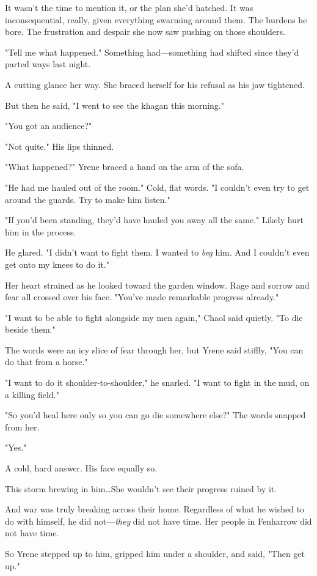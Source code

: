 It wasn't the time to mention it, or the plan she'd hatched.
It was inconsequential, really, given everything swarming around them.
The burdens he bore.
The frustration and despair she now saw pushing on those shoulders.

"Tell me what happened."
Something had---something had shifted since they'd parted ways last night.

A cutting glance her way.
She braced herself for his refusal as his jaw tightened.

But then he said, "I went to see the khagan this morning."

"You got an audience?"

"Not quite."
His lips thinned.

"What happened?"
Yrene braced a hand on the arm of the sofa.

"He had me hauled out of the room."
Cold, flat words.
"I couldn't even try to get around the guards.
Try to make him listen."

"If you'd been standing, they'd have hauled you away all the same."
Likely hurt him in the process.

He glared.
"I didn't want to fight them.
I wanted to \emph{beg} him.
And I couldn't even get onto my knees to do it."

Her heart strained as he looked toward the garden window.
Rage and sorrow and fear all crossed over his face.
"You've made remarkable progress already."

"I want to be able to fight alongside my men again," Chaol said quietly.
"To die beside them."

The words were an icy slice of fear through her, but Yrene said stiffly, "You can do that from a horse."

"I want to do it shoulder-to-shoulder," he snarled.
"I want to fight in the mud, on a killing field."

"So you'd heal here only so you can go die somewhere else?"
The words snapped from her.

"Yes."

A cold, hard answer.
His face equally so.

This storm brewing in him\ldots She wouldn't see their progress ruined by it.

And war was truly breaking across their home.
Regardless of what he wished to do with himself, he did not---\emph{they} did not have time.
Her people in Fenharrow did not have time.

So Yrene stepped up to him, gripped him under a shoulder, and said, "Then get up."

